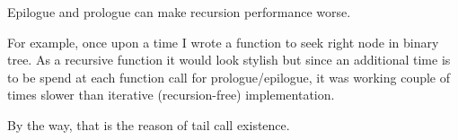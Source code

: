 \index{\Recursion}
{Epilogue and prologue can make recursion performance worse.}

{For example, once upon a time I wrote a function to seek right node in binary tree. 
As a recursive function it would look stylish but since an additional time
is to be spend at each function call
for prologue/epilogue, it was working couple of times slower than iterative (recursion-free)
implementation.}

{By the way, that is the reason of \gls{tail call} existence}.
